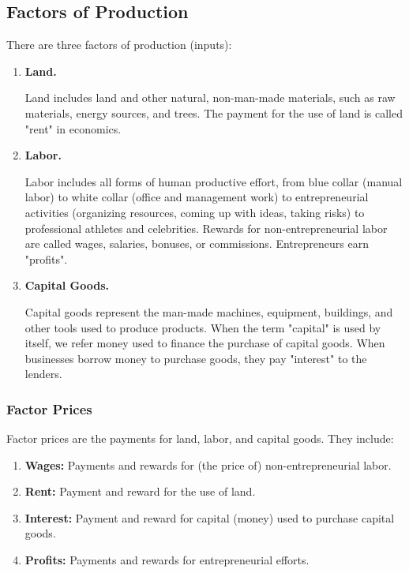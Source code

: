 \documentclass[a4paper, 12pt] {article}
\begin{document}
\subsection{Factors of Production}
There are three factors of production (inputs):
\begin{enumerate}
    \item \textbf{Land.}

        Land includes land and other natural, non-man-made materials, such as
        raw materials, energy sources, and trees. The payment for the use of 
        land is called "rent" in economics.

    \item \textbf{Labor.}

        Labor includes all forms of human productive effort, from blue collar 
        (manual labor) to white collar (office and management work) to 
        entrepreneurial activities (organizing resources, coming up with ideas,
        taking risks) to professional athletes and celebrities. Rewards for 
        non-entrepreneurial labor are called wages, salaries, bonuses, or 
        commissions. Entrepreneurs earn "profits".

    \item \textbf{Capital Goods.}
        
        Capital goods represent the man-made machines, equipment, buildings, 
        and other tools used to produce products. When the term "capital" is 
        used by itself, we refer money used to finance the purchase of capital
        goods. When businesses borrow money to purchase goods, they pay "interest"
        to the lenders.
\end{enumerate}

\subsubsection{Factor Prices}
Factor prices are the payments for land, labor, and capital goods. They include:
\begin{enumerate}
    \item \textbf{Wages:} Payments and rewards for (the price of)
        non-entrepreneurial labor.

    \item \textbf{Rent:} Payment and reward for the use of land.

    \item \textbf{Interest:} Payment and reward for capital (money) used to
        purchase capital goods.

    \item \textbf{Profits:} Payments and rewards for entrepreneurial
        efforts.
\end{enumerate}
\end{document}
